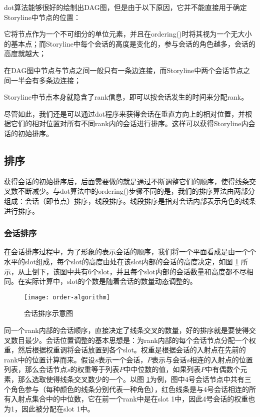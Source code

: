 dot算法能够很好的绘制出DAG图，但是由于以下原因，它并不能直接用于确定Storyline中节点的位置：
\begin{inparaenum}[\itshape 1 \upshape)]
\item 它将节点作为一个不可细分的单位元素，并且在ordering()时将其视为一个无大小的基本点；而Storyline中每个会话的高度是变化的，参与会话的角色越多，会话的高度就越大；
\item 在DAG图中节点与节点之间一般只有一条边连接，而Storyline中两个会话节点之间一半会有多条边连接；
\item Storyline中节点本身就隐含了rank信息，即可以按会话发生的时间来分配rank。
\end{inparaenum}
尽管如此，我们还是可以通过dot程序来获得会话在垂直方向上的相对位置，并根据它们的相对位置对所有不同rank内的会话进行排序。这样可以获得Storyline内会话的初始排序。

\subsection{排序}
获得会话的初始排序后，后面需要做的就是通过不断调整它们的顺序，使得线条交叉数不断减少。与dot算法中的ordering()步骤不同的是，我们的排序算法由两部分组成：会话（即节点）排序，线段排序。线段排序是指对会话内部表示角色的线条进行排序。
\subsubsection{会话排序}
在会话排序过程中，为了形象的表示会话的顺序，我们将一个平面看成是由一个个水平的slot组成，每个slot的高度由处在该slot内部的会话的高度决定，如图 \ref{fig:order-algorithm} 所示，从上倒下，该图中共有6个slot，并且每个slot内部的会话数量和高度都不尽相同。在实际计算中，slot的个数是随着会话的数量动态调整的。
\begin{figure}[htb]
    \centering
        \texttt{[image: order-algorithm]}
    \caption{会话排序示意图}
    \label{fig:order-algorithm}
\end{figure}
同一个rank内部的会话顺序，直接决定了线条交叉的数量，好的排序就是要使得交叉数目最少。会话位置调整的基本思想是\cite{warfield1977crossing}：为rank内部的每个会话节点分配一个权重，然后根据权重调将会话放置到各个slot。权重是根据会话的入射点在先前的rank中的位置计算而来。假设$s$表示一个会话，$P$表示与会话$s$相连的入射点的位置列表，那么会话节点$s$的权重等于列表$P$中中位数的值，如果列表$P$中有偶数个元素，那么选取使得线条交叉数少的一个。以图 \ref{fig:order-algorithm}为例，图中4号会话节点中共有三个角色参与（每种颜色的线条分别代表一种角色），红色线条是与4号会话相连的所有入射点集合中的中位数，它在前一个rank中是在slot 1中，因此4号会话的权重也为1，因此被分配在slot 1中。


